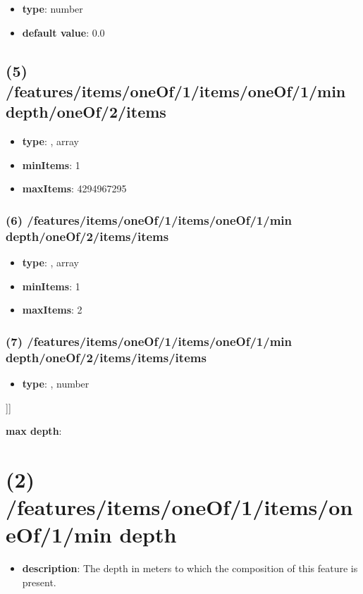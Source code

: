 \begin{itemize}[leftmargin=6em]\item {\bf type}: number\item {\bf default value}: 0.0
\end{itemize}\subsection{(5) /features/items/oneOf/1/items/oneOf/1/min depth/oneOf/2/items}
\begin{itemize}[leftmargin=5em]\item {\bf type}: , array\item {\bf minItems}: 1
\item {\bf maxItems}: 4294967295
\end{itemize}\subsubsection{(6) /features/items/oneOf/1/items/oneOf/1/min depth/oneOf/2/items/items}
\begin{itemize}[leftmargin=6em]\item {\bf type}: , array\item {\bf minItems}: 1
\item {\bf maxItems}: 2
\end{itemize}\subsubsection{(7) /features/items/oneOf/1/items/oneOf/1/min depth/oneOf/2/items/items/items}
\begin{itemize}[leftmargin=7em]\item {\bf type}: , number\end{itemize}]]\item {\bf max depth}: \section{(2) /features/items/oneOf/1/items/oneOf/1/min depth}
\begin{itemize}[leftmargin=2em]\item {\bf description}: The depth in meters to which the composition of this feature is present.
\end{itemize}
